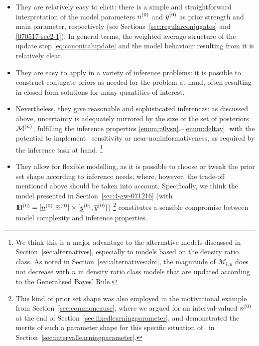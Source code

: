 \begin{itemize}
\item They are relatively easy to elicit:
there is a simple and straightforward interpretation of the model parameters $n^{(0)}$ and $y^{(0)}$
as prior strength and main parameter, respectively (see Sections~\ref{sec:regularconjugates} and \ref{070517-sec2-1}).
In general terms, the weighted average structure of the update step \eqref{eq:canonicalupdate}
and the model behaviour resulting from it is relatively clear.
\item They are easy to apply in a variety of inference problems:
it is possible to construct conjugate priors as needed for the problem at hand,
often resulting in closed form solutions for many quantities of interest.
\item Nevertheless, they give reasonable and sophisticated inferences:
as discussed above, uncertainty is adequately mirrored by the size of the set of posteriors $\mathcal{M}^{(n)}$,
fulfilling the inference properties \ref{enum:n0vsn}.--\ref{enum:deltay}.
with the potential to implement \pdc\ sensitivity or near-noninformativeness,
as required by the inference task at hand.%
\footnote{We think this is a major advantage to the alternative models
discussed in Section~\ref{sec:alternatives},
especially to models based on the density ratio class.
As noted in Section~\ref{sec:alternatives:drc}, the magnitude of $\mathcal{M}_{l,u}$ %
does not decrease with $n$ in density ratio class models that are updated according to the Generalised Bayes' Rule.}
\item They allow for flexible modelling, as
it is possible to choose or tweak the prior set shape according to inference needs,
where, however, the trade-off mentioned above should be taken into account.
Specifically, we think the model presented in Section~\ref{sec:4-gw-071216}
(with $\text{I}\!\Pi^{(0)} = [\underline{n}^{(0)}, \overline{n}^{(0)}] \times [\underline{y}^{(0)}, \overline{y}^{(0)}]$)%
\footnote{This kind of prior set shape was also employed in the motivational example
from Section~\ref{sec:commoncause}, where we argued for an interval-valued $n^{(0)}$
at the end of Section~\ref{sec:fixedlearningparameter},
and demonstrated the merits of such a parameter shape for this specific situation of \pdc\
in Section~\ref{sec:intervallearningparameter}.}
constitutes a sensible compromise between model complexity and inference properties.
\end{itemize}

